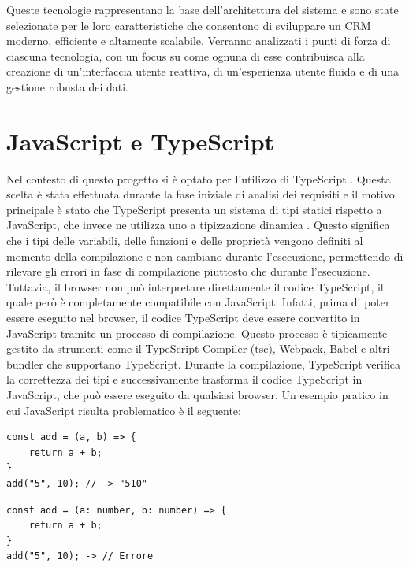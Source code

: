 \documentclass[target=bach,aauheader=,style=]{thud}
\begin{document}
\noindent Queste tecnologie rappresentano la base dell'architettura del sistema e sono state selezionate per le loro caratteristiche che consentono di sviluppare un CRM moderno, efficiente e altamente scalabile. Verranno analizzati i punti di forza di ciascuna tecnologia, con un focus su come ognuna di esse contribuisca alla creazione di un'interfaccia utente reattiva, di un'esperienza utente fluida e di una gestione robusta dei dati.

\section{JavaScript e TypeScript}
Nel contesto di questo progetto si è optato per l'utilizzo di TypeScript \cite{wikipedia:typescript}. Questa scelta è stata effettuata durante la fase iniziale di analisi dei requisiti e il motivo principale è stato che TypeScript presenta un sistema di tipi statici rispetto a JavaScript, che invece ne utilizza uno a tipizzazione dinamica \cite{bogner2022type}. Questo significa che i tipi delle variabili, delle funzioni e delle proprietà vengono definiti al momento della compilazione e non cambiano durante l'esecuzione, permettendo di rilevare gli errori in fase di compilazione piuttosto che durante l'esecuzione. Tuttavia, il browser non può interpretare direttamente il codice TypeScript, il quale però è completamente compatibile con JavaScript. Infatti, prima di poter essere eseguito nel browser, il codice TypeScript deve essere convertito in JavaScript tramite un processo di compilazione. Questo processo è tipicamente gestito da strumenti come il TypeScript Compiler (tsc), Webpack, Babel e altri bundler che supportano TypeScript. Durante la compilazione, TypeScript verifica la correttezza dei tipi e successivamente trasforma il codice TypeScript in JavaScript, che può essere eseguito da qualsiasi browser. Un esempio pratico in cui JavaScript risulta problematico è il seguente: 

\begin{minipage}[t]{0.45\textwidth}
    \begin{lstlisting}[caption=Coercion in JavaScript]
const add = (a, b) => {
    return a + b;
}   
add("5", 10); // -> "510"
    \end{lstlisting}
\end{minipage}
\hfill
\begin{minipage}[t]{0.45\textwidth}
    \begin{lstlisting}[caption=Errore in TypeScript]
const add = (a: number, b: number) => {
    return a + b;
}  
add("5", 10); -> // Errore
    \end{lstlisting}
\end{minipage}
\end{document}

